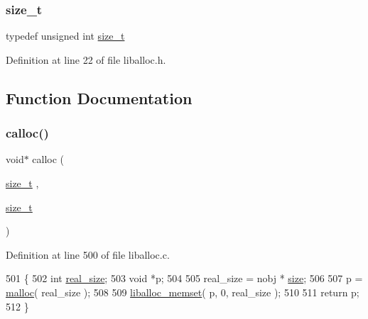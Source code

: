 \subsubsection{\texorpdfstring{size\+\_\+t}{size\_t}}
{\footnotesize\ttfamily typedef unsigned int \hyperlink{a00038_a7c94ea6f8948649f8d181ae55911eeaf_a7c94ea6f8948649f8d181ae55911eeaf}{size\+\_\+t}}



Definition at line 22 of file liballoc.\+h.



\subsection{Function Documentation}
\mbox{\label{a00038_a77e880b1033d5a912be4333fc5d31eef_a77e880b1033d5a912be4333fc5d31eef}} 
\subsubsection{\texorpdfstring{calloc()}{calloc()}}
{\footnotesize\ttfamily void$\ast$ calloc (\begin{DoxyParamCaption}\item[{\hyperlink{a00038_a7c94ea6f8948649f8d181ae55911eeaf_a7c94ea6f8948649f8d181ae55911eeaf}{size\+\_\+t}}]{,  }\item[{\hyperlink{a00038_a7c94ea6f8948649f8d181ae55911eeaf_a7c94ea6f8948649f8d181ae55911eeaf}{size\+\_\+t}}]{ }\end{DoxyParamCaption})}



Definition at line 500 of file liballoc.\+c.


\begin{DoxyCode}
501 \{
502        \textcolor{keywordtype}{int} \hyperlink{a00126_ad22b1c69bdce419783ac165f7f354245_ad22b1c69bdce419783ac165f7f354245}{real\_size};
503        \textcolor{keywordtype}{void} *p;
504 
505        real\_size = nobj * \hyperlink{a00126_a29b056a39f6022d32468e7913e6df936_a29b056a39f6022d32468e7913e6df936}{size};
506        
507        p = \hyperlink{a00035_a7ac38fce3243a7dcf448301ee9ffd392_a7ac38fce3243a7dcf448301ee9ffd392}{malloc}( real\_size );
508 
509        \hyperlink{a00035_ad824e94da51543e1febb05f96f0083ba_ad824e94da51543e1febb05f96f0083ba}{liballoc\_memset}( p, 0, real\_size );
510 
511        \textcolor{keywordflow}{return} p;
512 \}
\end{DoxyCode}
\mbox{\label{a00038_af07d89f5ceaea0c7c8252cc41fd75f37_af07d89f5ceaea0c7c8252cc41fd75f37}} 

